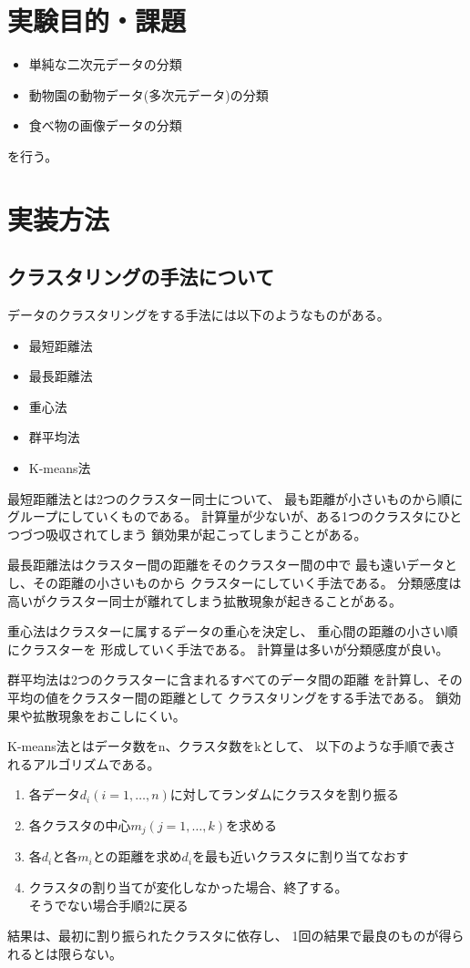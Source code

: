 \documentclass[dvipdfmx]{jsarticle}
\begin{document}
\section{実験目的・課題}

\begin{itemize}
  \item 単純な二次元データの分類
  \item 動物園の動物データ(多次元データ)の分類
  \item 食べ物の画像データの分類
\end{itemize}
を行う。

\section{実装方法}

\subsection{クラスタリングの手法について}

データのクラスタリングをする手法には以下のようなものがある。
\begin{itemize}
  \item 最短距離法
  \item 最長距離法
  \item 重心法
  \item 群平均法
  \item K-means法
\end{itemize}

最短距離法とは2つのクラスター同士について、
最も距離が小さいものから順にグループにしていくものである。
計算量が少ないが、ある1つのクラスタにひとつづつ吸収されてしまう
鎖効果が起こってしまうことがある。

最長距離法はクラスター間の距離をそのクラスター間の中で
最も遠いデータとし、その距離の小さいものから
クラスターにしていく手法である。
分類感度は高いがクラスター同士が離れてしまう拡散現象が起きることがある。

重心法はクラスターに属するデータの重心を決定し、
重心間の距離の小さい順にクラスターを
形成していく手法である。
計算量は多いが分類感度が良い。

群平均法は2つのクラスターに含まれるすべてのデータ間の距離
を計算し、その平均の値をクラスター間の距離として
クラスタリングをする手法である。
鎖効果や拡散現象をおこしにくい。

K-means法とはデータ数をn、クラスタ数をkとして、
以下のような手順で表されるアルゴリズムである。
\begin{enumerate}
  \item 各データ$d_i(i=1,\dots,n)$に対してランダムにクラスタを割り振る
  \item 各クラスタの中心$m_j(j=1,\dots,k)$を求める
  \item 各$d_i$と各$m_i$との距離を求め$d_i$を最も近いクラスタに割り当てなおす
  \item クラスタの割り当てが変化しなかった場合、終了する。\\そうでない場合手順2に戻る
\end{enumerate}
結果は、最初に割り振られたクラスタに依存し、
1回の結果で最良のものが得られるとは限らない。
\end{document}
